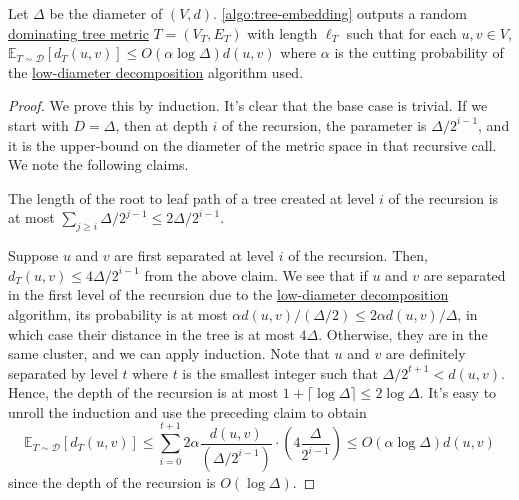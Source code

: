 \begin{theorem}\label{thm:tree-embed}
	Let \(\Delta \) be the diameter of \((V, d)\). \autoref{algo:tree-embedding} outputs a random \hyperref[def:dominating-tree-metric]{dominating tree metric} \(T = (V_T, E_T)\) with length \(\ell _T\) such that for each \(u, v \in V\), \(\mathbb{E}_{T \sim \mathcal{D} }[d_T(u, v)] \leq O(\alpha \log \Delta ) d(u, v)\) where \(\alpha \) is the cutting probability of the \hyperref[def:low-diameter-decomposition]{low-diameter decomposition} algorithm used.
\end{theorem}
\begin{proof}
	We prove this by induction. It's clear that the base case is trivial. If we start with \(D = \Delta \), then at depth \(i\) of the recursion, the parameter is \(\Delta / 2^{i-1}\), and it is the upper-bound on the diameter of the metric space in that recursive call. We note the following claims.

	\begin{claim}
		The length of the root to leaf path of a tree created at level \(i\) of the recursion is at most \(\sum_{j \geq i} \Delta / 2^{j-1} \leq 2 \Delta / 2^{i-1} \).
	\end{claim}

	Suppose \(u\) and \(v\) are first separated at level \(i\) of the recursion. Then, \(d_T(u, v) \leq 4 \Delta / 2^{i-1}\) from the above claim. We see that if \(u\) and \(v\) are separated in the first level of the recursion due to the \hyperref[def:low-diameter-decomposition]{low-diameter decomposition} algorithm, its probability is at most \(\alpha d(u, v) / (\Delta / 2) \leq 2 \alpha d(u, v) / \Delta \), in which case their distance in the tree is at most \(4 \Delta \). Otherwise, they are in the same cluster, and we can apply induction. Note that \(u\) and \(v\) are definitely separated by level \(t\) where \(t\) is the smallest integer such that \(\Delta / 2^{t+1} < d(u, v)\). Hence, the depth of the recursion is at most \(1 + \lceil \log \Delta \rceil \leq 2 \log \Delta \). It's easy to unroll the induction and use the preceding claim to obtain
	\begin{equation}\label{eq:tree-embed}
		\mathbb{E}_{T \sim \mathcal{D} }[d_T(u, v)]
		\leq \sum_{i=0}^{t+1} 2\alpha \frac{d(u, v)}{(\Delta / 2^{i-1})} \cdot \left( 4 \frac{\Delta }{2^{i-1}} \right)
		\leq O(\alpha \log \Delta ) d(u, v)
	\end{equation}
	since the depth of the recursion is \(O(\log \Delta )\).
\end{proof}

